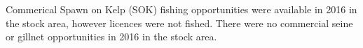 Commerical Spawn on Kelp (SOK) fishing opportunities were available in 2016 in the \regionName{} \regionType{} stock area, however licences were not fished. 
There were no commercial seine or gillnet opportunities in 2016 in the \regionName{} \regionType{} stock area.